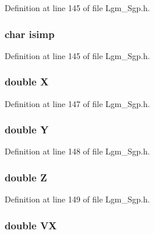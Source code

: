 Definition at line 145 of file Lgm\_\-Sgp.h.\hypertarget{struct___sgp_info_633c6d59b92dbf5b830ea47a87b9fc96}{
\subsubsection[{isimp}]{\setlength{\rightskip}{0pt plus 5cm}char {\bf isimp}}}
\label{struct___sgp_info_633c6d59b92dbf5b830ea47a87b9fc96}




Definition at line 145 of file Lgm\_\-Sgp.h.\hypertarget{struct___sgp_info_1059b82f84827fc49ea81b12566b3cdb}{
\subsubsection[{X}]{\setlength{\rightskip}{0pt plus 5cm}double {\bf X}}}
\label{struct___sgp_info_1059b82f84827fc49ea81b12566b3cdb}




Definition at line 147 of file Lgm\_\-Sgp.h.\hypertarget{struct___sgp_info_c8d59bf77d5ef21e7c7a88b08f14c825}{
\subsubsection[{Y}]{\setlength{\rightskip}{0pt plus 5cm}double {\bf Y}}}
\label{struct___sgp_info_c8d59bf77d5ef21e7c7a88b08f14c825}




Definition at line 148 of file Lgm\_\-Sgp.h.\hypertarget{struct___sgp_info_0f16a8f561453187897f0820186da39b}{
\subsubsection[{Z}]{\setlength{\rightskip}{0pt plus 5cm}double {\bf Z}}}
\label{struct___sgp_info_0f16a8f561453187897f0820186da39b}




Definition at line 149 of file Lgm\_\-Sgp.h.\hypertarget{struct___sgp_info_7a2579ee60469b7dc5ac77b902d71fa5}{
\subsubsection[{VX}]{\setlength{\rightskip}{0pt plus 5cm}double {\bf VX}}}
\label{struct___sgp_info_7a2579ee60469b7dc5ac77b902d71fa5}




